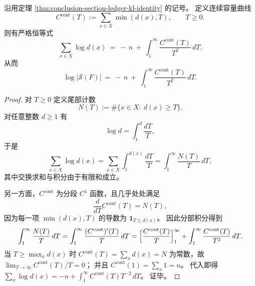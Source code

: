 \begin{proposition}[容量曲线对截面账本的积分表示]\label{prop:conclusion-section-ledger-capacity-functional}
沿用定理 \ref{thm:conclusion-section-ledger-kl-identity} 的记号。
定义连续容量曲线
\[
C^{\mathrm{cont}}(T):=\sum_{x\in X}\min(d(x),T),
\qquad T\ge 0.
\]
则有严格恒等式
\[
\sum_{x\in X}\log d(x)
\ =\
-\,n\ +\ \int_{1}^{\infty}\frac{C^{\mathrm{cont}}(T)}{T^{2}}\,dT.
\]
从而
\[
\log|\mathcal S(F)|
\ =\
-\,n\ +\ \int_{1}^{\infty}\frac{C^{\mathrm{cont}}(T)}{T^{2}}\,dT.
\]
\end{proposition}

\begin{proof}
对 \(T\ge 0\) 定义尾部计数
\[
N(T):=\#\{x\in X:\ d(x)\ge T\}.
\]
对任意整数 \(d\ge 1\) 有
\[
\log d=\int_{1}^{d}\frac{dT}{T},
\]
于是
\[
\sum_{x\in X}\log d(x)
=\sum_{x\in X}\int_{1}^{d(x)}\frac{dT}{T}
=\int_{1}^{\infty}\frac{N(T)}{T}\,dT,
\]
其中交换求和与积分由于有限和成立。
\par
另一方面，\(C^{\mathrm{cont}}\) 为分段 \(C^1\) 函数，且几乎处处满足
\[
\frac{d}{dT}C^{\mathrm{cont}}(T)=N(T),
\]
因为每一项 \(\min(d(x),T)\) 的导数为 \(\mathbf 1_{T\le d(x)}\)。
因此分部积分得到
\[
\int_{1}^{\infty}\frac{N(T)}{T}\,dT
=\int_{1}^{\infty}\frac{(C^{\mathrm{cont}})'(T)}{T}\,dT
=\Bigl[\frac{C^{\mathrm{cont}}(T)}{T}\Bigr]_{1}^{\infty}+\int_{1}^{\infty}\frac{C^{\mathrm{cont}}(T)}{T^{2}}\,dT.
\]
当 \(T\ge \max_x d(x)\) 时 \(C^{\mathrm{cont}}(T)=\sum_x d(x)=N\) 为常数，故 \(\lim_{T\to\infty}C^{\mathrm{cont}}(T)/T=0\)；
并且 \(C^{\mathrm{cont}}(1)=\sum_x 1=n\)。
代入即得
\(
\sum_x\log d(x)=-n+\int_1^\infty C^{\mathrm{cont}}(T)T^{-2}\,dT
\)。
证毕。
\end{proof}

\endinput

